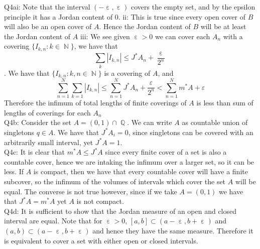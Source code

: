 \documentclass[letterpaper]{article}
\DeclareMathOperator{\N}{\mathbb{N}}
\DeclareMathOperator{\Q}{\mathbb{Q}}
\DeclareMathOperator{\ep}{\varepsilon}
\begin{document}
\noindent Q4ai: Note that the interval $(-\ep,\ep)$ covers the empty set, and by the epsilon principle it has a Jordan content of 0. 
\newline ii: This is true since every open cover of $B$ will also be an open cover of $A$. Hence the Jordan content of $B$ will be at least the Jordan content of $A$
\newline iii: We see given $\ep >0$ we can cover each $A_n$ with a covering $\{ I_{k,n}: k\in \N\}$, we have that $$\sum_k |I_{k,n}| \leq J^{*}A_n + \frac{\ep}{2^n}$$. We have that $\{I_{k,n}: k,n\in \N\}$ is a covering of $A$, and $$\sum_{n=1}^N \sum_{k=1} |I_{k,n}| \leq \sum_{n=1}^N J^{*}A_n + \frac{\varepsilon}{2^n} < \sum_{n=1}^N m^{*}A + \varepsilon$$
Therefore the infimum of total lengths of finite coverings of $A$ is less than sum of lengths of coverings for each $A_n$
\newline \\ Q4b: Consider the set $A = (0,1)\cap \Q$. We can write $A$ as countable union of singletons $q\in A$. We have that $J^{*}A_i=0$, since singletons can be covered with an arbitrarily small interval, yet $J^{*}A=1$. 
\newline \\ Q4c: It is clear that $m^{*}A\leq J^{*}A$ since every finite cover of a set is also a countable cover, hence we are intaking the infimum over a larger set, so it can be less. If $A$ is compact, then we have that every countable cover will have a finite subcover, so the infimum of the volumes of intervals which cover the set $A$ will be equal. The converse is not true however, since if we take $A=(0,1)$ we have that $J^{*}A = m^{*}A$ yet $A$ is not compact. 
\newline \\ Q4d: It is sufficient to show that the Jordan measure of an open and closed interval are equal. Note that for $\ep>0$, $[a,b]\subset (a-\ep,b+\ep)$ and $(a,b)\subset (a-\ep,b+\ep)$ and hence they have the same measure. Therefore it is equivalent to cover a set with either open or closed intervals. 
\end{document}
